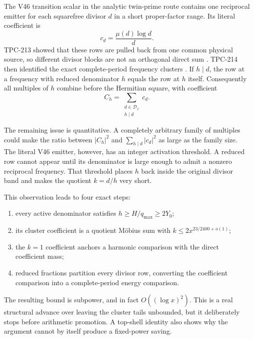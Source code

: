\documentclass[11pt]{article}
\theoremstyle{definition}
\theoremstyle{remark}
\newcommand{\Dd}{\mathcal D}
\begin{document}
The V46 transition scalar in the analytic twin-prime route contains one
reciprocal emitter for each squarefree divisor $d$ in a short proper-factor
range.  Its literal coefficient is
\begin{equation}
 c_d=\frac{\mu(d)\log d}{d}.
 \label{eq:coefficient}
\end{equation}
TPC-213 showed that these rows are pulled back from one common physical source,
so different divisor blocks are not an orthogonal direct sum
\cite{WangTPC213}.  TPC-214 then identified the exact complete-period
frequency clusters \cite{WangTPC214}.  If $h\mid d$, the row at a frequency
with reduced denominator $h$ equals the row at $h$ itself.  Consequently all
multiples of $h$ combine before the Hermitian square, with coefficient
\begin{equation}
 C_h=\sum_{\substack{d\in\Dd_x\\h\mid d}}c_d.
 \label{eq:cluster-coefficient}
\end{equation}

The remaining issue is quantitative.  A completely arbitrary family of
multiples could make the ratio between $|C_h|^2$ and
\(\sum_{h\mid d}|c_d|^2\) as large as the family size.  The literal V46
emitter, however, has an integer activation threshold.  A reduced row cannot
appear until its denominator is large enough to admit a nonzero reciprocal
frequency.  That threshold places $h$ back inside the original divisor band
and makes the quotient $k=d/h$ very short.

This observation leads to four exact steps:
\begin{enumerate}[leftmargin=2em]
 \item every active denominator satisfies $h\ge H/q_{\max}\ge2Y_0$;
 \item its cluster coefficient is a quotient M\"obius sum with
       $k\le2x^{23/2400+o(1)}$;
 \item the $k=1$ coefficient anchors a harmonic comparison with the direct
       coefficient mass;
 \item reduced fractions partition every divisor row, converting the
       coefficient comparison into a complete-period energy comparison.
\end{enumerate}

The resulting bound is subpower, and in fact $O((\log x)^2)$.  This is a real
structural advance over leaving the cluster tails unbounded, but it deliberately
stops before arithmetic promotion.  A top-shell identity also shows why the
argument cannot by itself produce a fixed-power saving.
\end{document}
